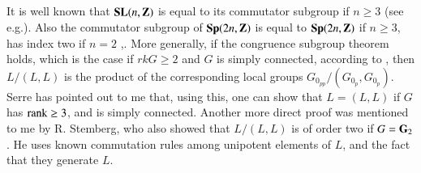 \subsection{}\label{art04-sec2.5}
It is well known that $\textbf{SL}(n,\mathbf{Z})$ is equal to its commutator subgroup if $n\geq 3$ (see \cite{art04-key3} e.g.). Also the commutator subgroup of $\mathbf{Sp}(2n,\mathbf{Z})$ is equal to $\mathbf{Sp}(2n,\mathbf{Z})$ if $n\geq 3$, has index two if $n=2$ \cite{art04-key3},\pageoriginale \cite{art04-key28}. More generally, if the congruence subgroup theorem holds, which is the case if $rkG\geq 2$ and $G$ is simply connected, according to \cite{art04-key22}, then $L/(L,L)$ is the product of the corresponding local groups $G_{0_{pp}}/(G_{0_{p}},G_{0_{p}})$. Serre has pointed out to me that, using this, one can show that $L=(L,L)$ if $G$ has $\operatorname{\mathrm{rank}} \geq 3$, and is simply connected. Another more direct proof was mentioned to me by R. Stemberg, who also showed that $L/(L,L)$ is of order two if $G=\mathbf{G}_{2}$. He uses known commutation rules among unipotent elements of $L$, and the fact that they generate $L$.

